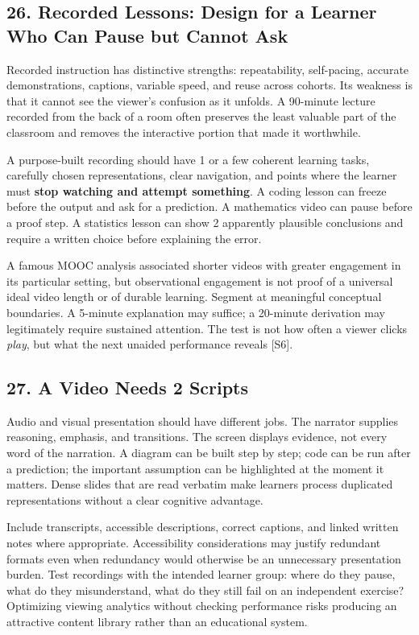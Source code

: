 \subsection*{26. Recorded Lessons: Design for a Learner Who Can Pause but Cannot Ask}

Recorded instruction has distinctive strengths: repeatability, self-pacing, accurate demonstrations, captions, variable speed, and reuse across cohorts. Its weakness is that it cannot see the viewer's confusion as it unfolds. A 90-minute lecture recorded from the back of a room often preserves the least valuable part of the classroom and removes the interactive portion that made it worthwhile.

A purpose-built recording should have 1 or a few coherent learning tasks, carefully chosen representations, clear navigation, and points where the learner must \textbf{stop watching and attempt something}. A coding lesson can freeze before the output and ask for a prediction. A mathematics video can pause before a proof step. A statistics lesson can show 2 apparently plausible conclusions and require a written choice before explaining the error.

A famous MOOC analysis associated shorter videos with greater engagement in its particular setting, but observational engagement is not proof of a universal ideal video length or of durable learning. Segment at meaningful conceptual boundaries. A 5-minute explanation may suffice; a 20-minute derivation may legitimately require sustained attention. The test is not how often a viewer clicks \emph{play}, but what the next unaided performance reveals [S6].

\subsection*{27. A Video Needs 2 Scripts}

Audio and visual presentation should have different jobs. The narrator supplies reasoning, emphasis, and transitions. The screen displays evidence, not every word of the narration. A diagram can be built step by step; code can be run after a prediction; the important assumption can be highlighted at the moment it matters. Dense slides that are read verbatim make learners process duplicated representations without a clear cognitive advantage.

Include transcripts, accessible descriptions, correct captions, and linked written notes where appropriate. Accessibility considerations may justify redundant formats even when redundancy would otherwise be an unnecessary presentation burden. Test recordings with the intended learner group: where do they pause, what do they misunderstand, what do they still fail on an independent exercise? Optimizing viewing analytics without checking performance risks producing an attractive content library rather than an educational system.

